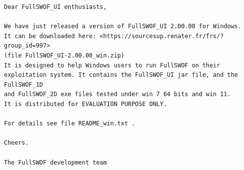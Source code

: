 \documentclass[a4paper, 11pt]{article}
\begin{document}
\begin{enumerate}
\begin{verbatim}
Dear FullSWOF_UI enthusiasts,

We have just released a version of FullSWOF_UI 2.00.00 for Windows.
It can be downloaded here: <https://sourcesup.renater.fr/frs/?group_id=997>
(file FullSWOF_UI-2.00.00_win.zip)
It is designed to help Windows users to run FullSWOF on their 
exploitation system. It contains the FullSWOF_UI jar file, and the FullSWOF_1D   
and FullSWOF_2D exe files tested under win 7 64 bits and win 11.
It is distributed for EVALUATION PURPOSE ONLY.

For details see file README_win.txt .

Cheers.

The FullSWOF development team 
\end{verbatim}
\end{enumerate}

\end{document}
